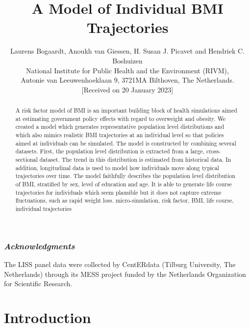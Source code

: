 \documentclass{imammb}
\numberwithin{equation}{section}
\begin{document}
\title{A Model of Individual BMI Trajectories}
\author{ {\sc Laurens Bogaardt, Anoukh van Giessen, H. Susan J. Picavet and Hendriek C. Boshuizen}\\[2pt]
National Institute for Public Health and the Environment (RIVM),\\
Antonie van Leeuwenhoeklaan 9, 3721MA Bilthoven, The Netherlands.\\[6pt]
{\rm [Received on 20 January 2023]}\vspace*{6pt}}
\pagestyle{headings}
\maketitle

\begin{abstract}
{A risk factor model of BMI is an important building block of health simulations aimed at estimating government policy effects with regard to overweight and obesity. We created a model which generates representative population level distributions and which also mimics realistic BMI trajectories at an individual level so that policies aimed at individuals can be simulated. The model is constructed by combining several datasets. First, the population level distribution is extracted from a large, cross-sectional dataset. The trend in this distribution is estimated from historical data. In addition, longitudinal data is used to model how individuals move along typical trajectories over time. The model faithfully describes the population level distribution of BMI, stratified by sex, level of education and age. It is able to generate life course trajectories for individuals which seem plausible but it does not capture extreme fluctuations, such as rapid weight loss.}
{micro-simulation, risk factor, BMI, life course, individual trajectories}
\end{abstract}

\subsubsection*{\textit{Acknowledgments}}
The LISS panel data were collected by CentERdata (Tilburg University, The Netherlands) through its MESS project funded by the Netherlands Organization for Scientific Research.

\section{Introduction}
\end{document}
